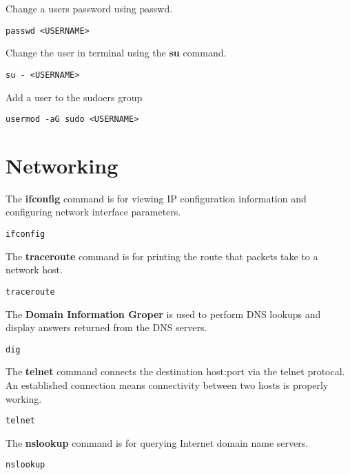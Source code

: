 Change a users password using passwd.
\begin{lstlisting}
passwd <USERNAME>
\end{lstlisting}

Change the user in terminal using the \textbf{su} command.
\begin{lstlisting}
su - <USERNAME>
\end{lstlisting}

Add a user to the sudoers group
\begin{lstlisting}
usermod -aG sudo <USERNAME>
\end{lstlisting}













\section{Networking}

The \textbf{ifconfig} command is for viewing IP configuration information and configuring network interface parameters.
\begin{lstlisting}
ifconfig
\end{lstlisting}

The \textbf{traceroute} command is for printing the route that packets take to a network host.
\begin{lstlisting}
traceroute
\end{lstlisting}

The \textbf{Domain Information Groper} is used to perform DNS lookups and display answers returned from the DNS servers.
\begin{lstlisting}
dig
\end{lstlisting}

The \textbf{telnet} command connects the destination host:port via the telnet protocal. An established connection means connectivity between two hosts is properly working.
\begin{lstlisting}
telnet
\end{lstlisting}

The \textbf{nslookup} command is for querying Internet domain name servers.
\begin{lstlisting}
nslookup
\end{lstlisting}


